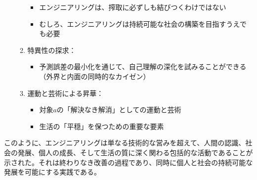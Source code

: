 \begin{enumerate}
\begin{enumerate}
    \begin{itemize}
    \tightlist
    \item
      エンジニアリングは、搾取に必ずしも結びつくわけではない
    \item
      むしろ、エンジニアリングは持続可能な社会の構築を目指すうえでも必要
    \end{itemize}
  \item
    特異性の探求：

    \begin{itemize}
    \tightlist
    \item
      予測誤差の最小化を通じて、自己理解の深化を試みることができる（外界と内面の同時的なカイゼン）
    \end{itemize}
  \item
    運動と芸術による昇華：

    \begin{itemize}
    \tightlist
    \item
      対象\(a\)の「解決なき解消」としての運動と芸術
    \item
      生活の「平穏」を保つための重要な要素
    \end{itemize}
  \end{enumerate}
\end{enumerate}

このように、エンジニアリングは単なる技術的な営みを超えて、人間の認識、社会の発展、個人の成長、そして生活の質に深く関わる包括的な活動であることが示された。それは終わりなき改善の過程であり、同時に個人と社会の持続可能な発展を可能にする実践である。
